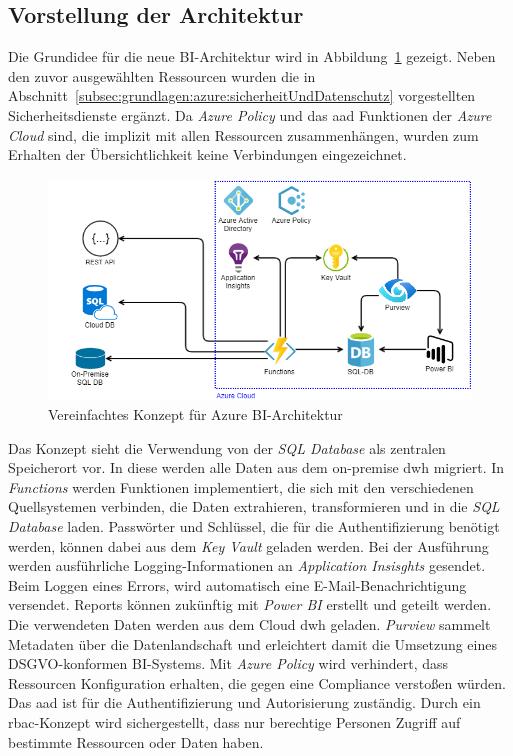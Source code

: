 \subsection{Vorstellung der Architektur}
Die Grundidee für die neue BI-Architektur wird in Abbildung~\ref{fig:chap03_4_konzeptArchitektur_offen} gezeigt. Neben den zuvor ausgewählten Ressourcen wurden die in Abschnitt~\ref{subsec:grundlagen:azure:sicherheitUndDatenschutz} vorgestellten Sicherheitsdienste ergänzt. Da \textit{Azure Policy} und das \ac{aad} Funktionen der \textit{Azure Cloud} sind, die implizit mit allen Ressourcen zusammenhängen, wurden zum Erhalten der Übersichtlichkeit keine Verbindungen eingezeichnet.

\begin{figure}[htbp]
 \centering
 \includegraphics[width=\textwidth]{gfx/konzept_1.png}
 \caption{Vereinfachtes Konzept für Azure BI-Architektur}
\label{fig:chap03_4_konzeptArchitektur_offen}
\end{figure}

Das Konzept sieht die Verwendung von der \textit{SQL Database} als zentralen Speicherort vor. In diese werden alle Daten aus dem on-premise \ac{dwh} migriert. In \textit{Functions} werden Funktionen implementiert, die sich mit den verschiedenen Quellsystemen verbinden, die Daten extrahieren, transformieren und in die \textit{SQL Database} laden. Passwörter und Schlüssel, die für die Authentifizierung benötigt werden, können dabei aus dem \textit{Key Vault} geladen werden. Bei der Ausführung werden ausführliche Logging-Informationen an \textit{Application Insisghts} gesendet. Beim Loggen eines Errors, wird automatisch eine E-Mail-Benachrichtigung versendet. Reports können zukünftig mit \textit{Power BI} erstellt und geteilt werden. Die verwendeten Daten werden aus dem Cloud \ac{dwh} geladen. \textit{Purview} sammelt Metadaten über die Datenlandschaft und erleichtert damit die Umsetzung eines DSGVO-konformen BI-Systems. Mit \textit{Azure Policy} wird verhindert, dass Ressourcen Konfiguration erhalten, die gegen eine Compliance verstoßen würden. Das \ac{aad} ist für die Authentifizierung und Autorisierung zuständig. Durch ein \ac{rbac}-Konzept wird sichergestellt, dass nur berechtige Personen Zugriff auf bestimmte Ressourcen oder Daten haben. 

